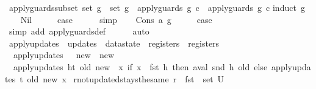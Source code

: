\begin{isabellebody}
\endisatagproof
{\isafoldproof}%
%
\isadelimproof
\isanewline
%
\endisadelimproof
\isanewline
{}\isamarkupfalse%
\ apply{\isacharunderscore}guards{\isacharunderscore}subset{\isacharcolon}\ {\isachardoublequoteopen}set\ g{\isacharprime}\ {\isasymsubseteq}\ set\ g\ {\isasymLongrightarrow}\ apply{\isacharunderscore}guards\ g\ c\ {\isasymlongrightarrow}\ apply{\isacharunderscore}guards\ g{\isacharprime}\ c{\isachardoublequoteclose}\isanewline
%
\isadelimproof
%
\endisadelimproof
%
\isatagproof
{}\isamarkupfalse%
{\isacharparenleft}induct\ g{\isacharparenright}\isanewline
\ \ \isamarkupfalse%
\ Nil\isanewline
\ \ \isamarkupfalse%
\ \isamarkupfalse%
\ {\isacharquery}case\isanewline
\ \ \ \ \isamarkupfalse%
\ simp\isanewline
{}\isamarkupfalse%
\isanewline
\ \ \isamarkupfalse%
\ {\isacharparenleft}Cons\ a\ g{\isacharparenright}\isanewline
\ \ \isamarkupfalse%
\ \isamarkupfalse%
\ {\isacharquery}case\isanewline
\ \ \ \ \isamarkupfalse%
\ {\isacharparenleft}simp\ add{\isacharcolon}\ apply{\isacharunderscore}guards{\isacharunderscore}def{\isacharparenright}\isanewline
\ \ \ \ \isamarkupfalse%
\ auto\isanewline
{}\isamarkupfalse%
%
\endisatagproof
{\isafoldproof}%
%
\isadelimproof
\isanewline
%
\endisadelimproof
\isanewline
{}\isamarkupfalse%
\ apply{\isacharunderscore}updates\ {\isacharcolon}{\isacharcolon}\ {\isachardoublequoteopen}updates\ {\isasymRightarrow}\ datastate\ {\isasymRightarrow}\ registers\ {\isasymRightarrow}\ registers{\isachardoublequoteclose}\ \isanewline
\ \ {\isachardoublequoteopen}apply{\isacharunderscore}updates\ {\isacharbrackleft}{\isacharbrackright}\ {\isacharunderscore}\ new\ {\isacharequal}\ new{\isachardoublequoteclose}\ {\isacharbar}\isanewline
\ \ {\isachardoublequoteopen}apply{\isacharunderscore}updates\ {\isacharparenleft}h{\isacharhash}t{\isacharparenright}\ old\ new\ {\isacharequal}\ {\isacharparenleft}{\isasymlambda}x{\isachardot}\ if\ x\ {\isacharequal}\ {\isacharparenleft}fst\ h{\isacharparenright}\ then\ {\isacharparenleft}aval\ {\isacharparenleft}snd\ h{\isacharparenright}\ old{\isacharparenright}\ else\ {\isacharparenleft}apply{\isacharunderscore}updates\ t\ old\ new{\isacharparenright}\ x{\isacharparenright}{\isachardoublequoteclose}\isanewline
\isanewline
{}\isamarkupfalse%
\ r{\isacharunderscore}not{\isacharunderscore}updated{\isacharunderscore}stays{\isacharunderscore}the{\isacharunderscore}same{\isacharcolon}\ {\isachardoublequoteopen}r\ {\isasymnotin}\ fst\ {\isacharbackquote}\ set\ U\ {\isasymLongrightarrow}\isanewline

\end{isabellebody}
